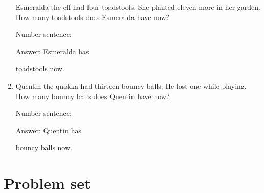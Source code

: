 \documentclass{tufte-book}
\begin{document}
\begin{enumerate}
  Esmeralda the elf had four toadstools. She planted eleven more in her
  garden. How many toadstools does Esmeralda have now?\medskip\par
  Number sentence:
  \dotfill\medskip\par
  Answer: Esmeralda has
  \dotfill\medskip\par\mbox{}\dotfill\medskip\par\mbox{}\dotfill\bigskip
  toadstools now.
\item
  Quentin the quokka had thirteen bouncy balls. He lost one while
  playing. How many bouncy balls does Quentin have now?\medskip\par
  Number sentence:
  \dotfill\medskip\par
  Answer: Quentin has
  \dotfill\medskip\par\mbox{}\dotfill\medskip\par\mbox{}\dotfill\bigskip
  bouncy balls now.
\end{enumerate}



\clearpage\section{Problem set }
\end{document}
